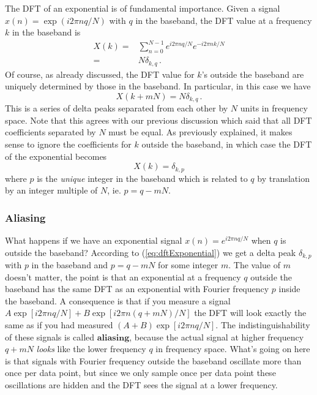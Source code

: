 \documentclass[twocolumn]{article}
\begin{document}
The DFT of an exponential is of fundamental importance.
Given a signal $x(n)=\exp(i2\pi nq/N)$ with $q$ in the baseband, the DFT value at a frequency $k$ in the baseband is
\begin{align}
X(k) =& \sum_{n=0}^{N-1} e^{i2\pi nq/N}e^{-i2\pi nk/N} \\
=& N \delta_{k, q} \, .
\end{align}
Of course, as already discussed, the DFT value for $k$'s outside the baseband are uniquely determined by those in the baseband.
In particular, in this case we have
\begin{equation}
X(k + mN) = N \delta_{k, q} \, .
\end{equation}
This is a series of delta peaks separated from each other by $N$ units in frequency space.
Note that this agrees with our previous discussion which said that all DFT coefficients separated by $N$ must be equal.
As previously explained, it makes sense to ignore the coefficients for $k$ outside the baseband, in which case the DFT of the exponential becomes
\begin{equation}
X(k) = \delta_{k,p} \label{eq:dftExponential}
\end{equation}
where $p$ is the \emph{unique} integer in the baseband which is related to $q$ by translation by an integer multiple of $N$, ie. $p=q-mN$.

\subsubsection{Aliasing}

What happens if we have an exponential signal $x(n)=e^{i2\pi nq/N}$ when $q$ is outside the baseband?
According to (\ref{eq:dftExponential}) we get a delta peak $\delta_{k,p}$ with $p$ in the baseband and $p = q-mN$ for some integer $m$.
The value of $m$ doesn't matter, the point is that an exponential at a frequency $q$ outside the baseband has the same DFT as an exponential with Fourier frequency $p$ inside the baseband.
A consequence is that if you measure a signal $A\exp\left[i2\pi nq/N\right]+B\exp\left[i2\pi n(q+mN)/N\right]$ the DFT will look exactly the same as if you had measured $(A+B)\exp\left[i2\pi nq/N\right]$.
The indistinguishability of these signals is called $\textbf{aliasing}$, because the actual signal at higher frequency $q+mN$ \emph{looks} like the lower frequency $q$ in frequency space.
What's going on here is that signals with Fourier frequency outside the baseband oscillate more than once per data point, but since we only sample once per data point these oscillations are hidden and the DFT sees the signal at a lower frequency.
\end{document}
